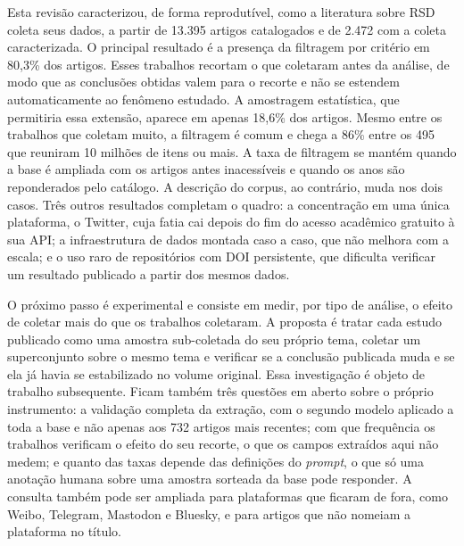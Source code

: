 \documentclass[11pt,a4paper]{article}
\begin{document}
Esta revisão caracterizou, de forma reprodutível, como a literatura sobre RSD
coleta seus dados, a partir de 13.395 artigos catalogados e de 2.472 com a
coleta caracterizada. O principal resultado é a presença da filtragem por
critério em 80,3\% dos artigos. Esses trabalhos recortam o que coletaram antes
da análise, de modo que as conclusões obtidas valem para o recorte e não se
estendem automaticamente ao fenômeno estudado. A amostragem estatística, que
permitiria essa extensão, aparece em apenas 18,6\% dos artigos. Mesmo entre os
trabalhos que coletam muito, a filtragem é comum e chega a 86\% entre os 495 que
reuniram 10 milhões de itens ou mais. A taxa de filtragem se mantém quando a base
é ampliada com os artigos antes inacessíveis e quando os anos são reponderados
pelo catálogo. A descrição do corpus, ao contrário, muda nos dois casos. Três outros resultados completam o quadro: a concentração em uma única
plataforma, o Twitter, cuja fatia cai depois do fim do acesso acadêmico
gratuito à sua API; a infraestrutura de dados montada caso a caso, que não
melhora com a escala; e o uso raro de repositórios com DOI persistente, que
dificulta verificar um resultado publicado a partir dos mesmos dados.

O próximo passo é experimental e consiste em medir, por tipo de análise, o
efeito de coletar mais do que os trabalhos coletaram. A proposta é tratar cada estudo publicado
como uma amostra sub-coletada do seu próprio tema, coletar um superconjunto
sobre o mesmo tema e verificar se a conclusão publicada muda e se ela já havia
se estabilizado no volume original. Essa investigação é objeto de trabalho
subsequente. Ficam também três questões em aberto sobre o próprio instrumento:
a validação completa da extração, com o segundo modelo aplicado a toda a base e
não apenas aos 732 artigos mais recentes; com que frequência os trabalhos
verificam o efeito do seu recorte, o que os campos extraídos aqui não medem; e
quanto das taxas depende das definições do \textit{prompt}, o que só uma
anotação humana sobre uma amostra sorteada da base pode responder. A consulta
também pode ser ampliada para plataformas que ficaram de fora, como Weibo,
Telegram, Mastodon e Bluesky, e para artigos que não nomeiam a plataforma no
título.

\clearpage


\end{document}
